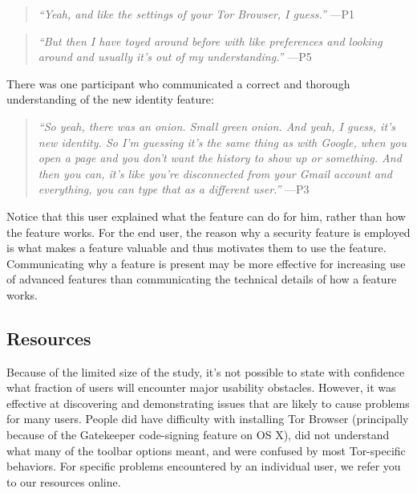 \documentclass[letterpaper,twocolumn,11pt]{article}
\begin{document}
\begin{quote}{\it
``Yeah, and like the settings of your Tor Browser, I guess.''} \mbox{---P1}
\end{quote}

\begin{quote}{\it
``But then I have toyed around before with like preferences and looking around and 
usually it's out of my understanding.''} \mbox{---P5}
\end{quote}

There was one participant who communicated a correct and thorough understanding of the 
new identity feature: 

\begin{quote}{\it
``So yeah, there was an onion. Small green onion. And yeah, I guess, it's new identity.
So I'm guessing it's the same thing as with Google, when you open a page and you don't 
want the history to show up or something. And then you can, it's like you're disconnected 
from your Gmail account and everything, you can type that as a different user.''} \mbox{---P3} 
\end{quote}

Notice that this user explained what the feature can do for him, rather than how the 
feature works. For the end user, the reason why a security feature is employed is what 
makes a feature valuable and thus motivates them to use the feature. Communicating why a 
feature is present may be more effective for increasing use of advanced features 
than communicating the technical details of how a feature works. 

\subsection{Resources}

\indent \indent Because of the limited size of the study, it's not possible to state with confidence what 
fraction of users will encounter major usability obstacles. However, it was effective at discovering 
and demonstrating issues that are likely to cause problems for many users. 
People did have difficulty with installing Tor Browser (principally because of the Gatekeeper 
code-signing feature on OS X), did not understand what many of the toolbar options meant, 
and were confused by most Tor-specific behaviors. For specific problems 
encountered by an individual user, we refer you to our resources online. 
\end{document}
